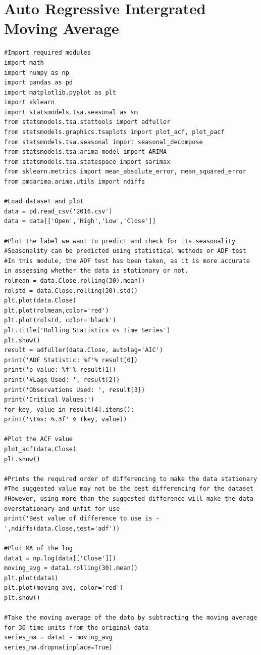 \documentclass[BTech]{srmuthesis}
\begin{document}
\section{Auto Regressive Intergrated Moving Average}

\begin{lstlisting}
#Import required modules
import math
import numpy as np
import pandas as pd
import matplotlib.pyplot as plt
import sklearn
import statsmodels.tsa.seasonal as sm
from statsmodels.tsa.stattools import adfuller
from statsmodels.graphics.tsaplots import plot_acf, plot_pacf
from statsmodels.tsa.seasonal import seasonal_decompose
from statsmodels.tsa.arima_model import ARIMA
from statsmodels.tsa.statespace import sarimax
from sklearn.metrics import mean_absolute_error, mean_squared_error
from pmdarima.arima.utils import ndiffs

#Load dataset and plot
data = pd.read_csv('2016.csv')
data = data[['Open','High','Low','Close']]

#Plot the label we want to predict and check for its seasonality
#Seasonality can be predicted using statistical methods or ADF test
#In this module, the ADF test has been taken, as it is more accurate in assessing whether the data is stationary or not.
rolmean = data.Close.rolling(30).mean()
rolstd = data.Close.rolling(30).std()
plt.plot(data.Close)
plt.plot(rolmean,color='red')
plt.plot(rolstd, color='black')
plt.title('Rolling Statistics vs Time Series')
plt.show()
result = adfuller(data.Close, autolag='AIC')
print('ADF Statistic: %f'% result[0])
print('p-value: %f'% result[1])
print('#Lags Used: ', result[2])
print('Observations Used: ', result[3])
print('Critical Values:')
for key, value in result[4].items():
print('\t%s: %.3f' % (key, value))

#Plot the ACF value
plot_acf(data.Close)
plt.show()

#Prints the required order of differencing to make the data stationary
#The suggested value may not be the best differencing for the dataset
#However, using more than the suggested difference will make the data overstationary and unfit for use
print('Best value of difference to use is - ',ndiffs(data.Close,test='adf'))

#Plot MA of the log
data1 = np.log(data[['Close']])
moving_avg = data1.rolling(30).mean()
plt.plot(data1)
plt.plot(moving_avg, color='red')
plt.show()

#Take the moving average of the data by subtracting the moving average for 30 time units from the original data
series_ma = data1 - moving_avg
series_ma.dropna(inplace=True)


\end{lstlisting}
\end{document}
